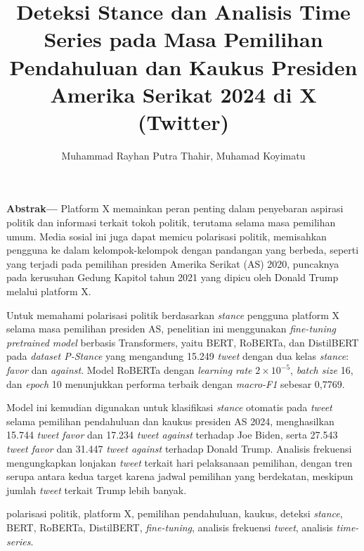 \documentclass[journal]{IEEEtran}
\newenvironment{abstrak}
  {\noindent\textbf{Abstrak—}}  
  {\par\vspace{0.5em}}
\newenvironment{kata_kunci}
  {\noindent\textbf{Kata kunci—}}  
  {\par\vspace{1em}}
\begin{document}
\title{Deteksi Stance dan Analisis Time Series pada Masa Pemilihan Pendahuluan dan Kaukus Presiden Amerika Serikat 2024 di X (Twitter)}

\author{Muhammad Rayhan Putra Thahir, Muhamad Koyimatu}


\maketitle

\begin{abstrak}
Platform X memainkan peran penting dalam penyebaran aspirasi politik dan informasi terkait tokoh politik, terutama selama masa pemilihan umum. Media sosial ini juga dapat memicu polarisasi politik, memisahkan pengguna ke dalam kelompok-kelompok dengan pandangan yang berbeda, seperti yang terjadi pada pemilihan presiden Amerika Serikat (AS) 2020, puncaknya pada kerusuhan Gedung Kapitol tahun 2021 yang dipicu oleh Donald Trump melalui platform X.

Untuk memahami polarisasi politik berdasarkan \textit{stance} pengguna platform X selama masa pemilihan presiden AS, penelitian ini menggunakan \textit{fine-tuning pretrained model} berbasis Transformers, yaitu BERT, RoBERTa, dan DistilBERT pada \textit{dataset P-Stance} yang mengandung 15.249 \textit{tweet} dengan dua kelas \textit{stance}: \textit{favor} dan \textit{against}. Model RoBERTa dengan \textit{learning rate} $2 \times 10^{-5}$, \textit{batch size} 16, dan \textit{epoch} 10 menunjukkan performa terbaik dengan \textit{macro-F1} sebesar 0,7769.

Model ini kemudian digunakan untuk klasifikasi \textit{stance} otomatis pada \textit{tweet} selama pemilihan pendahuluan dan kaukus presiden AS 2024, menghasilkan 15.744 \textit{tweet favor} dan 17.234 \textit{tweet against} terhadap Joe Biden, serta 27.543 \textit{tweet favor} dan 31.447 \textit{tweet against} terhadap Donald Trump. Analisis frekuensi mengungkapkan lonjakan \textit{tweet} terkait hari pelaksanaan pemilihan, dengan tren serupa antara kedua target karena jadwal pemilihan yang berdekatan, meskipun jumlah \textit{tweet} terkait Trump lebih banyak.
\end{abstrak}

\begin{kata_kunci}
    polarisasi politik, platform X, pemilihan pendahuluan, kaukus, deteksi \textit{stance}, BERT, RoBERTa, DistilBERT, \textit{fine-tuning}, analisis frekuensi \textit{tweet}, analisis \textit{time-series}.
\end{kata_kunci}
\end{document}
